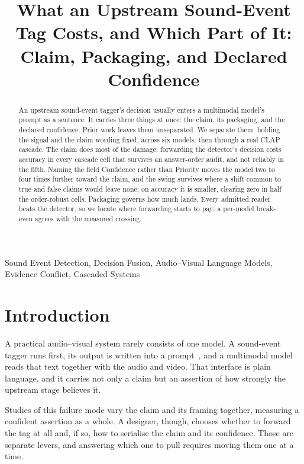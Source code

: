 \title{What an Upstream Sound-Event Tag Costs, and Which Part of It:
Claim, Packaging, and Declared Confidence}

\maketitle

\begin{abstract}
An upstream sound-event tagger's decision usually enters a multimodal model's prompt as a
sentence. It carries three things at once: the claim, its packaging, and the declared confidence.
Prior work leaves them unseparated. We separate them, holding the
signal and the claim wording fixed, across six models, then through a real CLAP
cascade. The claim does most of the damage: forwarding the detector's decision costs accuracy in
every cascade cell that survives an answer-order audit, and not reliably in the fifth. Naming the
field Confidence rather than Priority moves the model two to four times further toward the claim,
and the swing survives where a shift common to true and false claims would leave none; on accuracy it is
smaller, clearing zero in half the order-robust cells. Packaging governs how much lands. Every
admitted reader beats the detector, so we locate where forwarding starts to pay: a per-model
break-even agrees with the measured crossing.
\end{abstract}

\begin{keywords}
Sound Event Detection, Decision Fusion, Audio--Visual Language Models, Evidence Conflict, Cascaded Systems
\end{keywords}

\section{Introduction}
\label{sec:intro}

A practical audio--visual system rarely consists of one model. A sound-event tagger runs
first, its output is written into a prompt~\cite{ghosh2024gama}, and a multimodal model reads that text together with
the audio and video. That interface is plain language, and it carries not only a claim but an
assertion of how strongly the upstream stage believes it.

Studies of this failure mode vary the claim and its framing
together, measuring a confident assertion as a whole. A designer, though, chooses whether to
forward the tag at all and, if so, how to serialise the claim and its confidence. Those are
separate levers, and answering which one to pull requires moving them one at a time.

